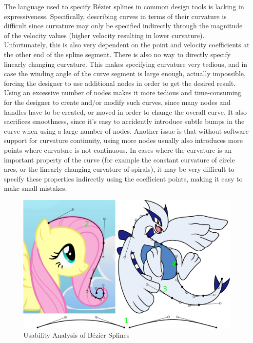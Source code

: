 \documentclass[a4paper]{article}
\begin{document}
				The language used to specify Bézier splines in common design tools is lacking in expressiveness. Specifically, describing curves in terms of their curvature is difficult since curvature may only be specified indirectly through the magnitude of the velocity values (higher velocity resulting in lower curvature). Unfortunately, this is also very dependent on the point and velocity coefficients at the other end of the spline segment. There is also no way to directly specify linearly changing curvature. This makes specifying curvature very tedious, and in case the winding angle of the curve segment is large enough, actually impossible, forcing the designer to use additional nodes in order to get the desired result. Using an excessive number of nodes makes it more tedious and time-consuming for the designer to create and/or modify such curves, since many nodes and handles have to be created, or moved in order to change the overall curve. It also sacrifices smoothness, since it's easy to accidently introduce subtle bumps in the curve when using a large number of nodes. Another issue is that without software support for curvature continuity, using more nodes usually also introduces more points where curvature is not continuous. In cases where the curvature is an important property of the curve (for example the constant curvature of circle arcs, or the linearly changing curvature of spirals), it may be very difficult to specify these properties indirectly using the coefficient points, making it easy to make small mistakes.

				\begin{figure}[htb]
					\centering
					\includegraphics[width=\textwidth]{../resources/usability_bezier.pdf}
					\caption{Usability Analysis of Bézier Splines}
					\label{figure:usability_bézier}
				\end{figure}
\end{document}
